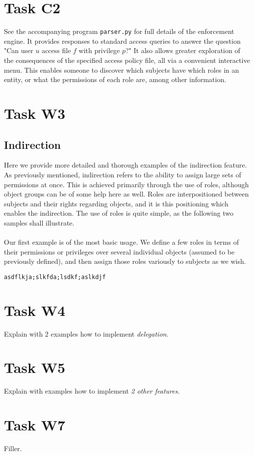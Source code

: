 \documentclass{article}
\providecommand{\task}[1]{\section{Task #1}}
\providecommand{\inlinecode}{\texttt}
\begin{document}
\task{C2}
See the accompanying program \inlinecode{parser.py} for full details of the enforcement engine. It provides responses to standard access queries to answer the question "Can user $u$ access file $f$ with privilege $p$?" It also allows greater exploration of the consequences of the specified access policy file, all via a convenient interactive menu. This enables someone to discover which subjects have which roles in an entity, or what the permissions of each role are, among other information.

\task{W3}
\subsection{Indirection}
Here we provide more detailed and thorough examples of the indirection feature.
As previously mentioned, indirection refers to the ability to assign large sets of permissions at once.
This is achieved primarily through the use of roles, although object groups can be of some help here as well.
Roles are interpositioned between subjects and their rights regarding objects, and it is this positioning which enables the indirection.
The use of roles is quite simple, as the following two samples shall illustrate. \\
 \\
Our first example is of the most basic usage. We define a few roles in terms of their permissions or privileges over several individual objects (assumed to be previously defined), and then assign those roles variously to subjects as we wish.
\begin{lstlisting}
asdflkja;slkfda;lsdkf;aslkdjf
\end{lstlisting}

\task{W4}
Explain with 2 examples how to implement \textit{delegation}.


\task{W5}
Explain with examples how to implement \textit{2 other features}.


\section{Task W7}
Filler.

\pagebreak

\printbibliography[heading=bibintoc]
\end{document}
